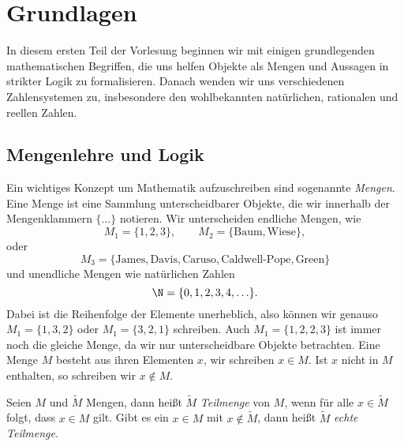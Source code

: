 \documentclass[letterpaper,10pt,english]{jupyterBook}
\begin{document}
\chapter{Grundlagen}
\label{\detokenize{grundlagen/grundlagen:grundlagen}}\label{\detokenize{grundlagen/grundlagen::doc}}
In diesem ersten Teil der Vorlesung beginnen wir mit einigen grundlegenden mathematischen Begriffen, die uns helfen Objekte als Mengen und Aussagen in strikter Logik zu formalisieren. Danach wenden wir uns verschiedenen Zahlensystemen zu, insbesondere den wohlbekannten natürlichen, rationalen und reellen Zahlen.


\section{Mengenlehre und Logik}
\label{\detokenize{grundlagen/mengenlogik:mengenlehre-und-logik}}\label{\detokenize{grundlagen/mengenlogik::doc}}
Ein wichtiges Konzept um Mathematik aufzuschreiben sind sogenannte \emph{Mengen}. Eine Menge ist eine Sammlung unterscheidbarer Objekte, die wir innerhalb der Mengenklammern \(\{ \ldots \}\) notieren. Wir unterscheiden endliche Mengen, wie
\begin{equation*}
 M_1 =  \{1,2,3\}, \qquad M_2=\{\text{Baum},\text{Wiese}\} ,
\end{equation*}
oder
\begin{equation*}
 M_3=\{\text{James}, \text{Davis}, \text{Caruso}, \text{Caldwell-Pope},\text{Green}\}
\end{equation*}
und unendliche Mengen wie natürlichen Zahlen
\begin{equation*}
\N =\{0,1,2,3,4,\ldots\}.
\end{equation*}
Dabei ist die Reihenfolge der Elemente unerheblich, also können wir genauso \( M_1 = \{1,3,2\}\) oder \(M_1=\{3,2,1\}\) schreiben. Auch \(M_1=\{1,2,2,3\}\) ist immer noch die gleiche Menge, da wir nur unterscheidbare Objekte betrachten.
Eine Menge \(M\) besteht aus ihren Elementen \(x\), wir schreiben \(x \in M\). Ist \(x\) nicht in \(M\) enthalten, so schreiben wir \(x \notin M\).
\label{grundlagen/mengenlogik:definition-0}
\begin{definition}{}{}



Seien \(M\) und \(\tilde M\) Mengen, dann heißt \(\tilde M\) \emph{Teilmenge} von \(M\), wenn für alle \(x \in \tilde M\) folgt, dass \(x \in M\) gilt. Gibt es ein \(x \in M\) mit \(x \notin \tilde M\), dann heißt \(\tilde M\) \emph{echte Teilmenge}.
\end{definition}
\end{document}
